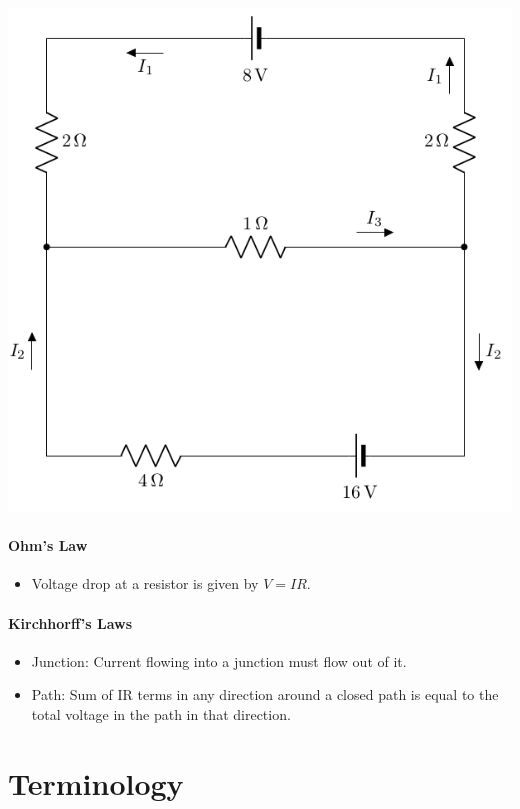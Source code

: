 \documentclass[12pt,a4paper]{article}
\begin{document}
\begin{minipage}{0.6\textwidth}
\includegraphics[scale=0.45]{circuit.png}
\end{minipage}
\begin{minipage}{0.35\textwidth}
\paragraph*{Ohm's Law}
	\begin{itemize}
	\item Voltage drop at a resistor is given by $V = IR$.
	\end{itemize}
\paragraph*{Kirchhorff's Laws}
	\begin{itemize}
	\item Junction: Current flowing into a junction must flow out of it.
	\item Path: Sum of IR terms in any direction around a closed path is equal to the total voltage in the path in that direction.
	\end{itemize}
\end{minipage}

\newpage

\section{Terminology}
\end{document}
